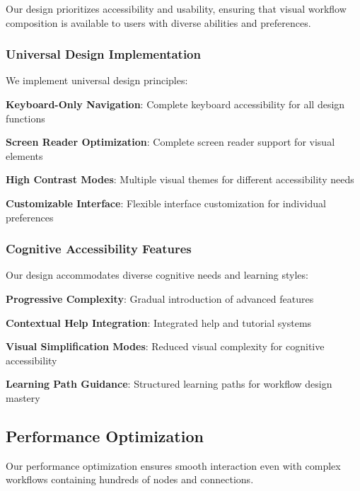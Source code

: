 Our design prioritizes accessibility and usability, ensuring that visual workflow composition is available to users with diverse abilities and preferences.

\subsubsection*{Universal Design Implementation}

We implement universal design principles:

\begin{compactlist}
    \item \textbf{Keyboard-Only Navigation}: Complete keyboard accessibility for all design functions
    \item \textbf{Screen Reader Optimization}: Complete screen reader support for visual elements
    \item \textbf{High Contrast Modes}: Multiple visual themes for different accessibility needs
    \item \textbf{Customizable Interface}: Flexible interface customization for individual preferences
\end{compactlist}

\subsubsection*{Cognitive Accessibility Features}

Our design accommodates diverse cognitive needs and learning styles:

\begin{compactlist}
    \item \textbf{Progressive Complexity}: Gradual introduction of advanced features
    \item \textbf{Contextual Help Integration}: Integrated help and tutorial systems
    \item \textbf{Visual Simplification Modes}: Reduced visual complexity for cognitive accessibility
    \item \textbf{Learning Path Guidance}: Structured learning paths for workflow design mastery
\end{compactlist}

\subsection*{Performance Optimization}

Our performance optimization ensures smooth interaction even with complex workflows containing hundreds of nodes and connections.

